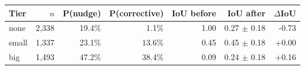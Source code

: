 \begin{tabular}{lrrrrrr}
\toprule
Tier & $n$ & P(nudge) & P(corrective) & IoU before & IoU after & $\Delta$IoU \\
\midrule
none & 2,338 & 19.4\% & 1.1\% & 1.00 & 0.27 $\pm$ 0.18 & -0.73 \\
small & 1,337 & 23.1\% & 13.6\% & 0.45 & 0.45 $\pm$ 0.18 & +0.00 \\
big & 1,493 & 47.2\% & 38.4\% & 0.09 & 0.24 $\pm$ 0.18 & +0.16 \\
\bottomrule
\end{tabular}
